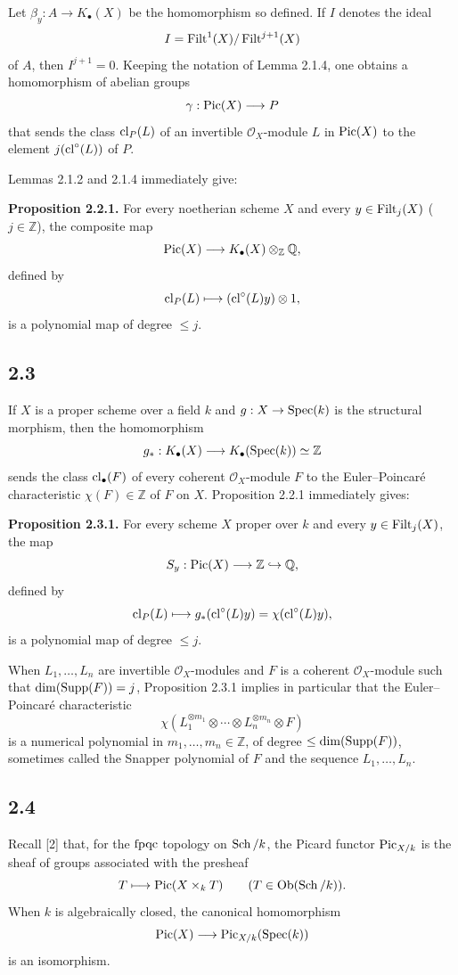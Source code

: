 Let $\beta_y:A\to K_\bullet(X)$ be the homomorphism so defined. If $I$
denotes the ideal
\[
I=\operatorname{Filt}^1(X)/\operatorname{Filt}^{j+1}(X)
\]
of $A$, then $I^{j+1}=0$. Keeping the notation of Lemma 2.1.4, one obtains a
homomorphism of abelian groups
\[
\gamma:\operatorname{Pic}(X)\longrightarrow P
\]
that sends the class $\operatorname{cl}_P(L)$ of an invertible $\mathcal O_X$-module $L$
in $\operatorname{Pic}(X)$ to the element $j(\operatorname{cl}^\circ(L))$ of $P$.

Lemmas 2.1.2 and 2.1.4 immediately give:

\textbf{Proposition 2.2.1.}
For every noetherian scheme $X$ and every $y\in\operatorname{Filt}_j(X)$
($j\in\mathbb Z$), the composite map
\[
\operatorname{Pic}(X)\longrightarrow K_\bullet(X)\otimes_{\mathbb Z}\mathbb Q,
\]
defined by
\[
\operatorname{cl}_P(L)\longmapsto(\operatorname{cl}^\circ(L)y)\otimes1,
\]
is a polynomial map of degree $\leq j$.

\subsection*{2.3}
If $X$ is a proper scheme over a field $k$ and
$g:X\to\operatorname{Spec}(k)$ is the structural morphism, then the homomorphism
\[
g_*:K_\bullet(X)\longrightarrow K_\bullet(\operatorname{Spec}(k))\simeq\mathbb Z
\]
sends the class $\operatorname{cl}_\bullet(F)$ of every coherent $\mathcal O_X$-module
$F$ to the Euler--Poincar\'e characteristic $\chi(F)\in\mathbb Z$ of $F$
on $X$. Proposition 2.2.1 immediately gives:

\textbf{Proposition 2.3.1.}
For every scheme $X$ proper over $k$ and every $y\in\operatorname{Filt}_j(X)$, the map
\[
S_y:\operatorname{Pic}(X)\longrightarrow\mathbb Z\hookrightarrow\mathbb Q,
\]
defined by
\[
\operatorname{cl}_P(L)\longmapsto
g_*(\operatorname{cl}^\circ(L)y)=\chi(\operatorname{cl}^\circ(L)y),
\]
is a polynomial map of degree $\leq j$.

When $L_1,\ldots,L_n$ are invertible $\mathcal O_X$-modules and $F$ is a
coherent $\mathcal O_X$-module such that $\dim(\operatorname{Supp}(F))=j$, Proposition
2.3.1 implies in particular that the Euler--Poincar\'e characteristic
\begin{equation}\tag{2.3.2}
\chi(L_1^{\otimes m_1}\otimes\cdots\otimes
L_n^{\otimes m_n}\otimes F)
\end{equation}
is a numerical polynomial in $m_1,\ldots,m_n\in\mathbb Z$, of degree
$\leq\dim(\operatorname{Supp}(F))$, sometimes called the Snapper polynomial of $F$ and
the sequence $L_1,\ldots,L_n$.

\subsection*{2.4}
Recall [2] that, for the $\mathrm{fpqc}$ topology on $\operatorname{Sch}/k$, the Picard functor
$\operatorname{Pic}_{X/k}$ is the sheaf of groups associated with the presheaf
\[
T\longmapsto\operatorname{Pic}(X\times_kT)
\qquad(T\in\operatorname{Ob}(\operatorname{Sch}/k)).
\]
When $k$ is algebraically closed, the canonical homomorphism
\[
\operatorname{Pic}(X)\longrightarrow\operatorname{Pic}_{X/k}(\operatorname{Spec}(k))
\]
is an isomorphism.

